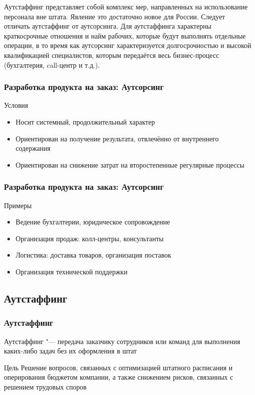 \documentclass{../industrial-development}
\begin{document}
\lecturenotes

Аутстаффинг представляет собой комплекс мер, направленных на использование персонала вне штата. Явление это достаточно новое для России. Следует отличать аутстаффинг от аутсорсинга. Для аутстаффинга характерны краткосрочные отношения и найм рабочих, которые будут выполнять отдельные операции, в то время как аутсорсинг характеризуется долгосрочностью и высокой квалификацией специалистов, которым передаётся весь бизнес-процесс (бухгалтерия, call-центр и т.д.).


\begin{frame} \frametitle{Разработка продукта на заказ: Аутсорсинг}
	\begin{block}{Условия}
		\begin{itemize}
			\item Носит системный, продолжительный характер
			\item Ориентирован на получение результата, отвлечённо от внутреннего содержания
			\item Ориентирован на снижение затрат на второстепенные регулярные процессы
		\end{itemize}
	\end{block}
\end{frame}


\begin{frame} \frametitle{Разработка продукта на заказ: Аутсорсинг}
	\begin{block}{Примеры}
		\begin{itemize}
			\item Ведение бухгалтерии, юридическое сопровождение
			\item Организация продаж: колл-центры, консультанты
			\item Логистика: доставка товаров, организация поставок
			\item Организация технической поддержки
		\end{itemize}
	\end{block}
\end{frame}


\subsection{Аутстаффинг}


\begin{frame} \frametitle{Аутстаффинг}
	\begin{block}{}
		\alert{Аутстаффинг} "--- передача заказчику сотрудников или команд для выполнения каких-либо задач без их оформления в штат
	\end{block}
	\begin{block}{Цель}
		Решение вопросов, связанных с оптимизацией штатного расписания и оперирования бюджетом компании, а также снижением рисков, связанных с решением трудовых споров
	\end{block}
\end{frame}
\end{document}
